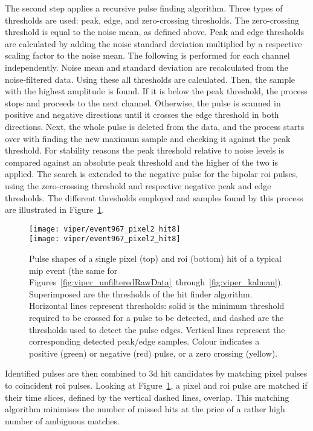 The second step applies a recursive pulse finding algorithm.
Three types of thresholds are used: peak, edge, and zero-crossing thresholds.
The zero-crossing threshold is equal to the noise mean, as defined above.
Peak and edge thresholds are calculated by adding the noise standard deviation multiplied by a respective scaling factor to the noise mean.
The following is performed for each channel independently.
Noise mean and standard deviation are recalculated from the noise-filtered data.
Using these all thresholds are calculated.
Then, the sample with the highest amplitude is found.
If it is below the peak threshold, the process stops and proceeds to the next channel.
Otherwise, the pulse is scanned in positive and negative directions until it crosses the edge threshold in both directions.
Next, the whole pulse is deleted from the data, and the process starts over with finding the new maximum sample and checking it against the peak threshold.
For stability reasons the peak threshold relative to noise levels is compared against an absolute peak threshold and the higher of the two is applied.
The search is extended to the negative pulse for the bipolar \gls{roi} pulses, using the zero-crossing threshold and respective negative peak and edge thresholds.
The different thresholds employed and samples found by this process are illustrated in Figure~\ref{fig:viper_hitFinder}.

\begin{figure}[htb]
	\centering
	\texttt{[image: viper/event967\_pixel2\_hit8]}\\
	\texttt{[image: viper/event967\_pixel2\_hit8]}
	\caption[Pulse shapes of typical pixel demonstrator event]{%
		Pulse shapes of a single pixel (top) and \acrshort{roi} (bottom) hit of a typical \acrshort{mip} event (the same for Figures~\ref{fig:viper_unfilteredRawData}~through~\ref{fig:viper_kalman}).
		Superimposed are the thresholds of the hit finder algorithm. Horizontal lines represent thresholds: solid is the minimum threshold required to be crossed for a pulse to be detected, and dashed are the thresholds used to detect the pulse edges.
		Vertical lines represent the corresponding detected peak/edge samples.
		Colour indicates a positive (green) or negative (red) pulse, or a zero crossing (yellow).
	}
	\label{fig:viper_hitFinder}
\end{figure}

Identified pulses are then combined to \gls{3d} hit candidates by matching pixel pulses to coincident \gls{roi} pulses.
Looking at Figure~\ref{fig:viper_hitFinder}, a pixel and \gls{roi} pulse are matched if their time slices, defined by the vertical dashed lines, overlap.
This matching algorithm minimises the number of missed hits at the price of a rather high number of ambiguous matches.

